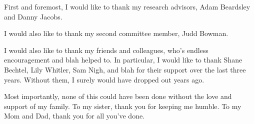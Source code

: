 First and foremost, I would like to thank my research advisors, Adam Beardsley
and Danny Jacobs.

I would also like to thank my second committee member, Judd Bowman.

I would also like to thank my friends and colleagues, who's endless encouragement
and blah helped to. In particular, I would like to thank Shane Bechtel, Lily Whitler,
Sam Nigh, and blah for their support over the last three years. Without them, I
surely would have dropped out years ago.

Most importantly, none of this could have been done without the love and support
of my family. To my sister, thank you for keeping me humble. To my Mom and Dad,
thank you for all you've done.

\clearpage
